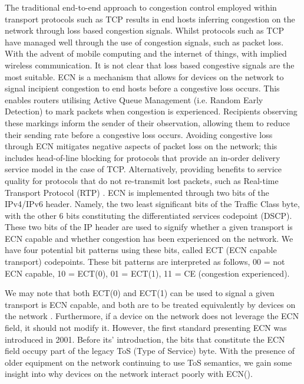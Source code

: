 \documentclass{l4proj}
\begin{document}
The traditional end-to-end approach to congestion control employed within transport protocols such as TCP results in end hosts inferring congestion on the network through loss based congestion signals. Whilst protocols such as TCP have managed well through the use of congestion signals, such as packet loss. With the advent of mobile computing and the internet of things, with implied wireless communication. It is not clear that loss based congestive signals are the most suitable.
ECN is a mechanism that allows for devices on the network to signal incipient congestion to end hosts before a congestive loss occurs\citep{rfc3168}. This enables routers utilising Active Queue Management (i.e. Random Early Detection) to mark packets when congestion is experienced. Recipients observing these markings inform the sender of their observation, allowing them to reduce their sending rate before a congestive loss occurs. Avoiding congestive loss through ECN mitigates negative aspects of packet loss on the network; this includes head-of-line blocking for protocols that provide an in-order delivery service model in the case of TCP. Alternatively, providing benefits to service quality for protocols that do not re-transmit lost packets, such as Real-time Transport Protocol (RTP) \citep{rfc6679}.
ECN is implemented through two bits of the IPv4/IPv6 header. Namely, the two least significant bits of the Traffic Class byte, with the other 6 bits constituting the differentiated services codepoint (DSCP). These two bits of the IP header are used to signify whether a given transport is ECN capable and whether congestion has been experienced on the network. We have four potential bit patterns using these bits, called ECT (ECN capable transport) codepoints. These bit patterns are interpreted as follows, 00 = not ECN capable, 10 = ECT(0), 01 = ECT(1), 11 = CE (congestion experienced).

We may note that both ECT(0) and ECT(1) can be used to signal a given transport is ECN capable, and both are to be treated equivalently by devices on the network \citep{rfc3168}. Furthermore, if a device on the network does not leverage the ECN field, it should not modify it. However, the first standard presenting ECN was introduced in 2001. Before its' introduction, the bits that constitute the ECN field occupy part of the legacy ToS (Type of Service) byte. With the presence of older equipment on the network continuing to use ToS semantics, we gain some insight into why devices on the network interact poorly with ECN(\cite{kuhlewind_state_2013}).
\end{document}
